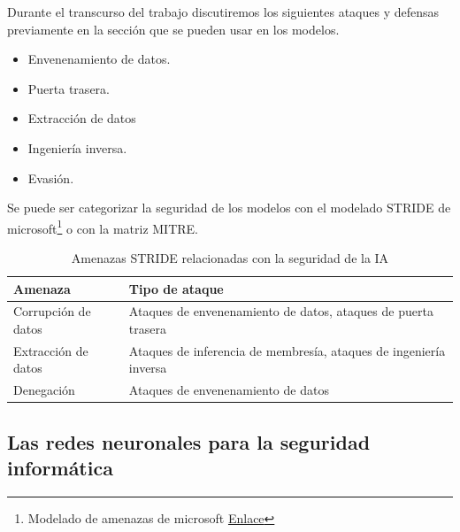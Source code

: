Durante el transcurso del trabajo discutiremos los siguientes ataques y defensas previamente en la sección  que se pueden usar en los modelos.

\begin{itemize}
    \item Envenenamiento de datos.
    \item Puerta trasera.
    \item Extracción de datos
    \item Ingeniería inversa.
    \item Evasión.
\end{itemize}

Se puede ser categorizar la seguridad de los modelos con el modelado \gls{STRIDE} de microsoft\footnote{Modelado de amenazas de microsoft \href{https://learn.microsoft.com/es-es/azure/security/develop/threat-modeling-tool-threats}{Enlace}} o con la matriz \gls{MITRE}.

\begin{table}[H]
    \centering
    \small
    \begin{tabularx}{\textwidth}{|l|X|}
        \hline
        \textbf{Amenaza}    & \textbf{Tipo de ataque}                                           \\
        \hline
        Corrupción de datos & Ataques de envenenamiento de datos, ataques de puerta trasera     \\
        Extracción de datos & Ataques de inferencia de membresía, ataques de ingeniería inversa \\
        Denegación          & Ataques de envenenamiento de datos                                \\
        \hline
    \end{tabularx}
    \caption{Amenazas STRIDE relacionadas con la seguridad de la IA}
    \label{tab:amenazas}
\end{table}


\subsection{Las redes neuronales para la seguridad informática}






